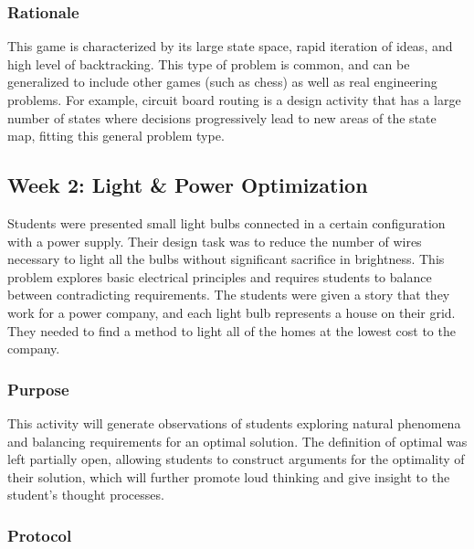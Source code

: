 	\subsubsection{Rationale}
	
	This game is characterized by its large state space, rapid iteration of ideas, and high level of backtracking. This type of problem is common, and can be generalized to include other games (such as chess) as well as real engineering problems. For example, circuit board routing is a design activity that has a large number of states where decisions progressively lead to new areas of the state map, fitting this general problem type.

\subsection{Week 2: Light \& Power Optimization}

	Students were presented small light bulbs connected in a certain
	configuration with a power supply. Their design task was to reduce
	the number of wires necessary to light all the bulbs without significant
	sacrifice in brightness. This problem explores basic electrical principles
	and requires students to balance between contradicting requirements.
	The students were given a story that they work for a power company,
	and each light bulb represents a house on their grid. They needed to
	find a method to light all of the homes at the lowest cost to the
	company.
	
	
	\subsubsection{Purpose}
	
	This activity will generate observations of students exploring natural
	phenomena and balancing requirements for an optimal solution. The
	definition of optimal was left partially open, allowing students
	to construct arguments for the optimality of their solution, which
	will further promote loud thinking and give insight to the student's
	thought processes.
	
	
	\subsubsection{Protocol}
	
